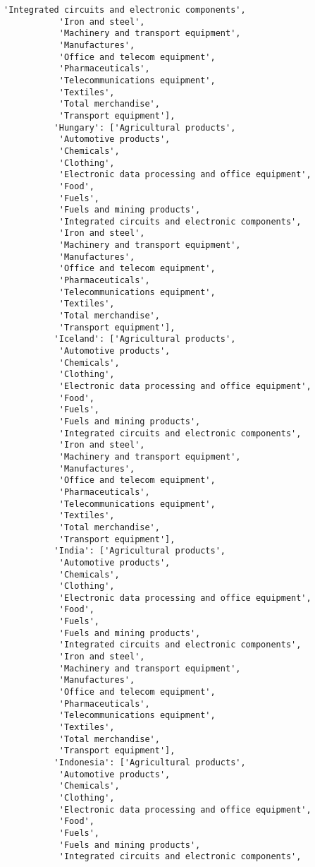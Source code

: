 \documentclass[11pt]{article}
\begin{document}
\begin{Verbatim}[commandchars=\\\{\}]
           'Integrated circuits and electronic components',
           'Iron and steel',
           'Machinery and transport equipment',
           'Manufactures',
           'Office and telecom equipment',
           'Pharmaceuticals',
           'Telecommunications equipment',
           'Textiles',
           'Total merchandise',
           'Transport equipment'],
          'Hungary': ['Agricultural products',
           'Automotive products',
           'Chemicals',
           'Clothing',
           'Electronic data processing and office equipment',
           'Food',
           'Fuels',
           'Fuels and mining products',
           'Integrated circuits and electronic components',
           'Iron and steel',
           'Machinery and transport equipment',
           'Manufactures',
           'Office and telecom equipment',
           'Pharmaceuticals',
           'Telecommunications equipment',
           'Textiles',
           'Total merchandise',
           'Transport equipment'],
          'Iceland': ['Agricultural products',
           'Automotive products',
           'Chemicals',
           'Clothing',
           'Electronic data processing and office equipment',
           'Food',
           'Fuels',
           'Fuels and mining products',
           'Integrated circuits and electronic components',
           'Iron and steel',
           'Machinery and transport equipment',
           'Manufactures',
           'Office and telecom equipment',
           'Pharmaceuticals',
           'Telecommunications equipment',
           'Textiles',
           'Total merchandise',
           'Transport equipment'],
          'India': ['Agricultural products',
           'Automotive products',
           'Chemicals',
           'Clothing',
           'Electronic data processing and office equipment',
           'Food',
           'Fuels',
           'Fuels and mining products',
           'Integrated circuits and electronic components',
           'Iron and steel',
           'Machinery and transport equipment',
           'Manufactures',
           'Office and telecom equipment',
           'Pharmaceuticals',
           'Telecommunications equipment',
           'Textiles',
           'Total merchandise',
           'Transport equipment'],
          'Indonesia': ['Agricultural products',
           'Automotive products',
           'Chemicals',
           'Clothing',
           'Electronic data processing and office equipment',
           'Food',
           'Fuels',
           'Fuels and mining products',
           'Integrated circuits and electronic components',

\end{Verbatim}
\end{document}
